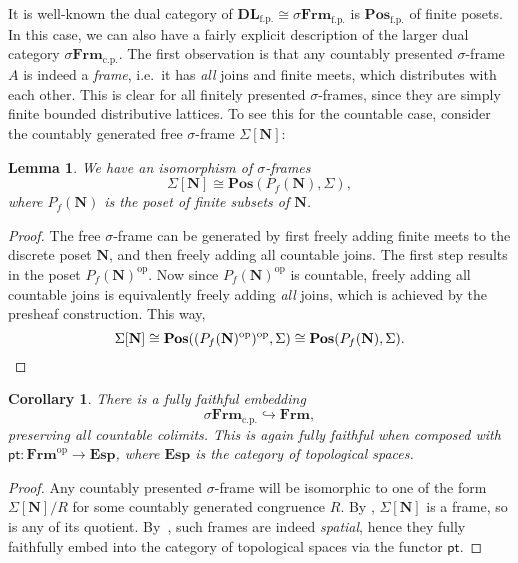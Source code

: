 \documentclass[a4paper,12pt]{amsart}
\newtheorem{lemma}[theorem]{Lemma}
\newtheorem{corollary}[theorem]{Corollary}
\theoremstyle{definition}
\newcommand{\mb}[1]{\mathbf{#1}}
\newcommand{\mr}[1]{\mathrm{#1}}
\newcommand{\ms}[1]{\mathsf{#1}}
\newcommand{\Pos}{\mb{Pos}}
\newcommand{\DL}{\mb{DL}}
\newcommand{\op}{^{\mathrm{op}}}
\newcommand{\hook}{\hookrightarrow}
\newcommand{\fp}{_{\mr{f.p.}}}
\newcommand{\cp}{_{\mr{c.p.}}}
\newcommand{\N}{\mb N}
\newcommand{\pt}{\ms{pt}}
\newcommand{\sFrm}{\sigma\mb{Frm}}
\newcommand{\Frm}{\mb{Frm}}
\newcommand{\Topp}{\mb{Esp}}
\begin{document}
It is well-known the dual category of $\DL\fp \cong \sFrm\fp$ is $\Pos\fp$ of finite posets. In this case, we can also have a fairly explicit description of the larger dual category $\sFrm\cp$. The first observation is that any countably presented $\sigma$-frame $A$ is indeed a \emph{frame}, i.e.\ it has \emph{all} joins and finite meets, which distributes with each other. This is clear for all finitely presented $\sigma$-frames, since they are simply finite bounded distributive lattices. To see this for the countable case, consider the countably generated free $\sigma$-frame $\Sigma[\N]$:

\begin{lemma}\label{lem:cgfreesframe}
  We have an isomorphism of $\sigma$-frames
  \[ \Sigma[\N] \cong \Pos(P_f(\N),\Sigma), \]
  where $P_f(\N)$ is the poset of finite subsets of $\N$.
\end{lemma}
\begin{proof}
  The free $\sigma$-frame can be generated by first freely adding finite meets to the discrete poset $\N$, and then freely adding all countable joins. The first step results in the poset $P_f(\N)\op$. Now since $P_f(\N)\op$ is countable, freely adding all countable joins is equivalently freely adding \emph{all} joins, which is achieved by the presheaf construction. This way,
  \[ \Sigma[\N] \cong \Pos((P_f(\N)\op)\op,\Sigma) \cong \Pos(P_f(\N),\Sigma). \qedhere \]
\end{proof}


\begin{corollary}\label{cor:dualsframe}
  There is a fully faithful embedding
  \[ \sFrm\cp \hook \Frm, \]
  preserving all countable colimits. This is again fully faithful when composed with $\ms{pt} \colon \Frm\op \to \Topp$, where $\Topp$ is the category of topological spaces.
\end{corollary}
\begin{proof}
  Any countably presented $\sigma$-frame will be isomorphic to one of the form $\Sigma[\N]/R$ for some countably generated congruence $R$. By , $\Sigma[\N]$ is a frame, so is any of its quotient. By~\cite[Thm.\ 6.2.4]{makkai2006first}, such frames are indeed \emph{spatial}, hence they fully faithfully embed into the category of topological spaces via the functor $\pt$.
\end{proof}
\end{document}

